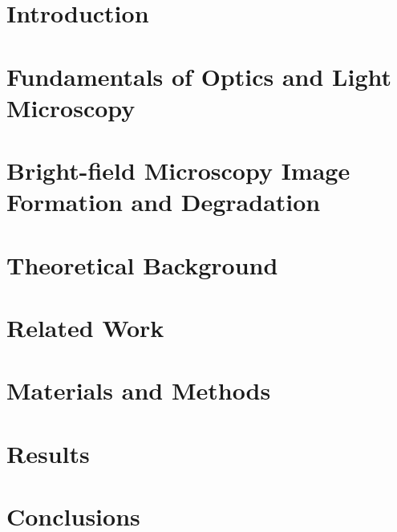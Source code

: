 \documentclass[mestrado, pre-defesa]{packages/icmc}
\begin{document}
\textual

\chapter{Introduction}
\label{chapter:introduction}


\chapter{Fundamentals of Optics and Light Microscopy}
\label{chapter:fundamentals-of-optics-and-light-microscopy}


\chapter{Bright-field Microscopy Image Formation and Degradation}
\label{chapter:blur-characterization-and-image-formation}


\chapter{Theoretical Background}
\label{chapter:theoretical-background}


\chapter{Related Work}
\label{chapter:related-work}


\chapter{Materials and Methods}
\label{chapter:materials-and-methods}


\chapter{Results}
\label{chapter:results}


\chapter{Conclusions}
\label{chapter:conclusions}

\end{document}
